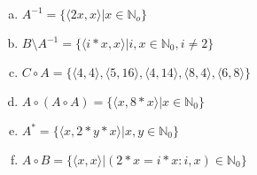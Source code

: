 \documentclass{article} %
\begin{document}
\begin{enumerate}[(a)]
	\item
	$ A^{-1} = \{\langle 2x,x \rangle \lvert x \in \mathbb N_o \}$
	\item
	$ B \setminus A^{-1} = \{\langle i*x,x \rangle \lvert i,x \in \mathbb N_0, i \neq 2\}$
	\item
	$C \circ A = \{\langle 4,4 \rangle,\langle 5,16 \rangle, \langle 4,14\rangle, \langle 8,4 \rangle,\langle 6,8\rangle\}$
	\item
	$A \circ (A \circ A) = \{ \langle x,8*x\rangle\lvert x\in \mathbb N_0\}$
 	\item
	 $A^{*} = \{\langle x ,2*y*x\rangle\lvert x,y \in \mathbb N_0\}$
	 \item 
	 $A \circ B = \{\langle x,x\rangle \lvert (2*x = i*x : i,x) \in \mathbb N_0\}$

\end{enumerate}
\end{document}
